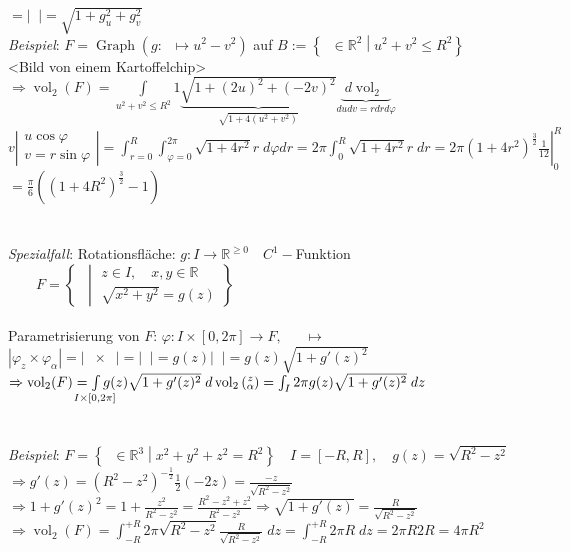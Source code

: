 \documentclass[12pt,a4paper,titlepage]{article}
\newcommand{\setR}{\mathbb{R}}
\newcommand{\Graph}{\operatorname{Graph}}
\newcommand{\vol}{\operatorname{vol}}
\newcommand{\twovec}[2]{\mathop{\left(\substack{#1 \\ #2}\right)}}
\newcommand{\threevec}[3]{\mathop{\left(\substack{#1 \\ #2 \\ #3}\right)}}
\begin{document}
$=\left|\threevec{-g_u}{-g_v}{1}\right|=\sqrt{1+g_u^2+g_v^2}$ \\
\newpage
\textit{Beispiel}: $F=\Graph(g:\twovec{u}{v}\mapsto u^2-v^2)$ auf $B:=\left\{\twovec{u}{v}\in\setR^2\middle|u^2+v^2\leq R^2\right\}$ \\
<Bild von einem Kartoffelchip> $\Rightarrow \vol_2(F)=\int\limits_{u^2+v^2\leq R^2}1\underbrace{\sqrt{1+(2u)^2+(-2v)^2}}_{\sqrt{1+4(u^2+v^2)}} \underbrace{\;d\vol_2\twovec{u}{v}}_{dudv=rdrd\varphi}$ \\
$v\left|\substack{u\cos\varphi \\ v=r\sin\varphi}\right| = \int_{r=0}^R\int_{\varphi=0}^{2\pi}\sqrt{1+4r^2}r \;d\varphi dr = 2\pi\int_0^R\sqrt{1+4r^2}r \;dr = \left.2\pi(1+4r^2)^{\frac{3}{2}}\frac{1}{12}\right|_0^R$ \\
$ = \frac{\pi}{6}((1+4R^2)^{\frac{3}{2}}-1)$ \\
\\
\\
\textit{Spezialfall}: Rotationsfläche: $g:I\to\setR^{\geq0} \quad C^1-$Funktion $\quad\quad F=\left\{\threevec{x}{y}{z}\middle|\substack{z\in I,\quad x,y\in\setR \\ \sqrt{x^2+y^2}=g(z)}\right\}$ \\
\\
Parametrisierung von $F$: $\varphi:I\times[0,2\pi]\to F, \quad\twovec{z}{\alpha}\mapsto\threevec{g(z)\alpha}{g(z)\sin\alpha}{z}$ \\
$|\varphi_z\times\varphi_\alpha|=\left|\threevec{g'(z)\cos\alpha}{g'(z)\sin\alpha}{1}\times\threevec{-g(z)\sin\alpha}{+g(z)\cos\alpha}{0}\right| = \left|\threevec{-g(z)\cos\alpha}{-g(z)\sin\alpha}{g(z)g'(z)}\right| = g(z)\left|\threevec{-\cos\alpha}{-\sin\alpha}{g'(z)}\right| = g(z)\sqrt{1+g'(z)^2}$ \\
$\Rightarrow \vol_2(F)=\int\limits_{\mathclap{I\times[0,2\pi]}}g(z)\sqrt{1+g'(z)^2} \;d\vol_2\twovec{z}{\alpha} = \int_I2\pi g(z)\sqrt{1+g'(z)^2} \;dz$ \\
\\
\\
\textit{Beispiel}: $F=\left\{\threevec{x}{y}{z}\in\setR^3\middle| x^2+y^2+z^2=R^2\right\} \quad I=[-R,R],\quad g(z)=\sqrt{R^2-z^2}$ \\
$\Rightarrow g'(z)=(R^2-z^2)^{-\frac{1}{2}}\frac{1}{2}(-2z)=\frac{-z}{\sqrt{R^2-z^2}}$ \\
$\Rightarrow 1+g'(z)^2=1+\frac{z^2}{R^2-z^2}=\frac{R^2-z^2+z^2}{R^2-z^2} \Rightarrow \sqrt{1+g'(z)}=\frac{R}{\sqrt{R^2-z^2}}$ \\
$\Rightarrow \vol_2(F)=\int_{-R}^{+R}2\pi \sqrt{R^2-z^2}\frac{R}{\sqrt{R^2-z^2}} \;dz = \int_{-R}^{+R}2\pi R\;dz = 2\pi R2R = 4\pi R^2$
\end{document}
